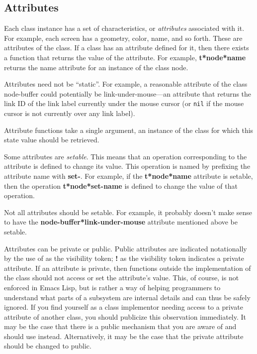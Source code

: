 \subsection{Attributes}  

Each class instance has a set of characteristics, or {\em
attributes}\/ associated with it.  For example, each screen has a
geometry, color, name, and so forth.  These are attributes of the
class.  If a class has an attribute defined for it, then there exists
a function that returns the value of the attribute.  For example, {\bf
t*node*name} returns the {\sf name} attribute for an instance of the
class {\sf node}.

Attributes need not be ``static''.  For example, a reasonable
attribute of the class {\sf node-buffer} could potentially be {\sf
link-under-mouse}---an attribute that returns the link ID of the link
label currently under the mouse cursor (or {\tt nil} if the mouse
cursor is not currently over any link label).

Attribute functions take a single argument, an instance of the class
for which this state value should be retrieved.

Some attributes are {\em setable}.  This means that an operation
corresponding to the attribute is defined to change its value. This
operation is named by prefixing the attribute name with {\bf set-}.
For example, if the {\bf t*node*name} attribute is setable,
then the operation {\bf t*node*set-name} is defined to change
the value of that operation.

Not all attributes should be setable.  For example, it probably
doesn't make sense to have the {\bf node-buffer*link-under-mouse}
attribute mentioned above be setable.

Attributes can be private or public.  Public attributes are indicated
notationally by the use of {\bf *} as the visibility token; {\bf !} as
the visibility token indicates a private attribute.  If an attribute is
private, then functions outside the implementation of the class should
not access or set the attribute's value.  This, of course, is not
enforced in Emacs Lisp, but is rather a way of helping programmers to 
understand what parts of a subsystem are internal details and can thus
be safely ignored.  If you find yourself as a class implementor needing 
access to a private attribute of another class, you should publicize this
observation immediately.  It may be the case that there is a public mechanism
that you are aware of and should use instead.  Alternatively, it may be
the case that the private attribute should be changed to public.

